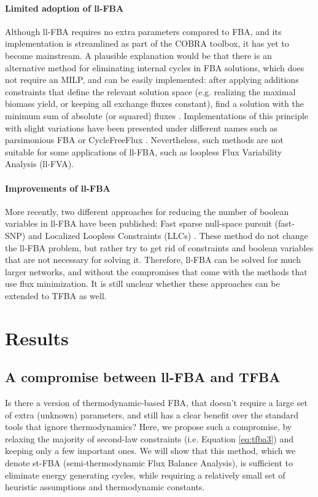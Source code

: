 \documentclass[twocolumn]{bmcart}%
\begin{document}
\paragraph{Limited adoption of ll-FBA} Although ll-FBA requires no extra parameters compared to FBA, and its implementation is streamlined as part of the COBRA toolbox, it has yet to become mainstream. A plausible explanation would be that there is an alternative method for eliminating internal cycles in FBA solutions, which does not require an MILP, and can be easily implemented: after applying additions constraints that  define the relevant solution space (e.g. realizing the maximal biomass yield, or keeping all exchange fluxes constant), find a solution with the minimum sum of absolute (or squared) fluxes \cite{Holzhutter2004-qj}. Implementations of this principle with slight variations have been presented under different names such as parsimonious FBA \cite{Lewis2010-rx, Schuetz2012-sv} or CycleFreeFlux \cite{Desouki2015-lh}. Nevertheless, such methods are not suitable for some applications of ll-FBA, such as loopless Flux Variability Analysis (ll-FVA).

\paragraph{Improvements of ll-FBA}
More recently, two different approaches for reducing the number of boolean variables in ll-FBA have been published: Fast sparse null-space pursuit (fast-SNP) \cite{Saa2016} and Localized Loopless Constraints (LLCs) \cite{Chan2017}. These method do not change the ll-FBA problem, but rather try to get rid of constraints and boolean variables that are not necessary for solving it. Therefore, ll-FBA can be solved for much larger networks, and without the compromises that come with the methods that use flux minimization. It is still unclear whether these approaches can be extended to TFBA as well.

\section*{Results}

\subsection*{A compromise between ll-FBA and TFBA}
Is there a version of thermodynamic-based FBA, that doesn't require a large set of extra (unknown) parameters, and still has a clear benefit over the standard tools that ignore thermodynamics? Here, we propose such a compromise, by relaxing the majority of second-law constraints (i.e. Equation \ref{eq:tfba3}) and keeping only a few important ones. We will show that this method, which we denote st-FBA (semi-thermodynamic Flux Balance Analysis), is sufficient to eliminate energy generating cycles, while requiring a relatively small set of heuristic assumptions and thermodynamic constants.
\end{document}
